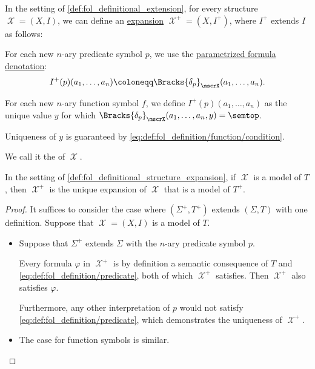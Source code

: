 \begin{definition}\label{def:fol_definitional_structure_expansion}\mimprovised
  In the setting of \cref{def:fol_definitional_extension}, for every structure \( \mscrX = (X, I) \), we can define an \hyperref[def:fol_structure_expansion]{expansion} \( \mscrX^+ = (X, I^+) \), where \( I^+ \) extends \( I \) as follows:
  \begin{thmenum}
     For each new \( n \)-ary predicate symbol \( p \), we use the \hyperref[def:fol_parameterized_formula_denotation]{parametrized formula denotation}:
    \begin{equation*}
      I^+(p)(a_1, \ldots, a_n) \coloneqq \Bracks{\delta_p}_\mscrX(a_1, \ldots, a_n).
    \end{equation*}

     For each new \( n \)-ary function symbol \( f \), we define \( I^+(p)(a_1, \ldots, a_n) \) as the unique value \( y \) for which \( \Bracks{\delta_p}_\mscrX(a_1, \ldots, a_n, y) = \semtop \).

    Uniqueness of \( y \) is guaranteed by \eqref{eq:def:fol_definition/function/condition}.
  \end{thmenum}

  We call it the  of \( \mscrX \).
\end{definition}

\begin{lemma}\label{thm:fol_definitional_extension_model_uniqueness}
  In the setting of \cref{def:fol_definitional_structure_expansion}, if \( \mscrX \) is a model of \( T \), then \( \mscrX^+ \) is the unique expansion of \( \mscrX \) that is a model of \( T^+ \).
\end{lemma}
\begin{proof}
  It suffices to consider the case where \( (\Sigma^+, T^+) \) extends \( (\Sigma, T) \) with one definition. Suppose that \( \mscrX = (X, I) \) is a model of \( T \).

  \begin{itemize}
    \item Suppose that \( \Sigma^+ \) extends \( \Sigma \) with the \( n \)-ary predicate symbol \( p \).

    Every formula \( \varphi \) in \( \mscrX^+ \) is by definition a semantic consequence of \( T \) and \eqref{eq:def:fol_definition/predicate}, both of which \( \mscrX^+ \) satisfies. Then \( \mscrX^+ \) also satisfies \( \varphi \).

    Furthermore, any other interpretation of \( p \) would not satisfy \eqref{eq:def:fol_definition/predicate}, which demonstrates the uniqueness of \( \mscrX^+ \).

    \item The case for function symbols is similar.
  \end{itemize}
\end{proof}

